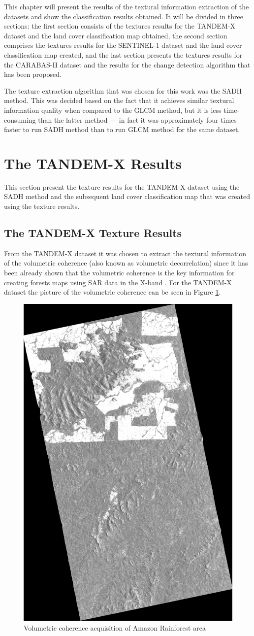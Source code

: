This chapter will present the results of the textural information extraction of the datasets and show the classification results obtained. It will be divided in three sections: the first section consists of the textures results for the TANDEM-X dataset and the land cover classification map obtained, the second section comprises the textures results for the SENTINEL-1 dataset and the land cover classification map created, and the last section presents the textures results for the CARABAS-II dataset and the results for the change detection algorithm that has been proposed.  

The texture extraction algorithm that was chosen for this work was the SADH method. This was decided based on the fact that it achieves similar textural information quality when compared to the GLCM method, but it is less time-consuming than the latter method --- in fact it was approximately four times faster to run SADH method than to run GLCM method for the same dataset.

\section{The TANDEM-X Results}
This section present the texture results for the TANDEM-X dataset using the SADH method and the subsequent land cover classification map that was created using the texture results.

\subsection{The TANDEM-X Texture Results}
From the TANDEM-X dataset it was chosen to extract the textural information of the volumetric coherence (also known as volumetric decorrelation) since it has been already shown that the volumetric coherence is the key information for creating forests maps using SAR data in the X-band \cite{Paolo,Rizzoli, Alberto}. For the TANDEM-X dataset the picture of the volumetric coherence can be seen in Figure \ref{fig:gamma_vol_tandemx}.

\begin{figure}[H]
    \centering
    \includegraphics[width=0.4\linewidth]{Cap3-Results/coSSC_master_gamma_vol.png}
    \caption{Volumetric coherence acquisition of Amazon Rainforest area}
    \label{fig:gamma_vol_tandemx}
\end{figure}

